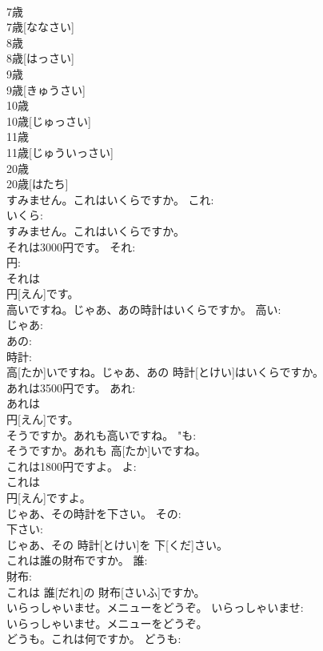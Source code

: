 \documentclass[8pt]{extreport}
\begin{document}
\begin{CJK}{UTF8}{min}
\\	7歳	
\\	7歳[ななさい]		
\\	8歳	
\\	8歳[はっさい]		
\\	9歳	
\\	9歳[きゅうさい]		
\\	10歳	
\\	10歳[じゅっさい]		
\\	11歳	
\\	11歳[じゅういっさい]		
\\	20歳	
\\	20歳[はたち]		
\\	すみません。これはいくらですか。	これ: 
\\	いくら: 
\\	すみません。これはいくらですか。		
\\	それは3000円です。	それ: 
\\	円: 
\\	それは 
\\	円[えん]です。		
\\	高いですね。じゃあ、あの時計はいくらですか。	高い: 
\\	じゃあ: 
\\	あの: 
\\	時計: 
\\	高[たか]いですね。じゃあ、あの 時計[とけい]はいくらですか。		
\\	あれは3500円です。	あれ: 
\\	あれは 
\\	円[えん]です。		
\\	そうですか。あれも高いですね。	"も: 
\\	そうですか。あれも 高[たか]いですね。		
\\	これは1800円ですよ。	よ: 
\\	これは 
\\	円[えん]ですよ。		
\\	じゃあ、その時計を下さい。	その: 
\\	下さい: 
\\	じゃあ、その 時計[とけい]を 下[くだ]さい。		
\\	これは誰の財布ですか。	誰: 
\\	財布: 
\\	これは 誰[だれ]の 財布[さいふ]ですか。		
\\	いらっしゃいませ。メニューをどうぞ。	いらっしゃいませ: 
\\	いらっしゃいませ。メニューをどうぞ。		
\\	どうも。これは何ですか。	どうも: 

\end{CJK}
\end{document}
